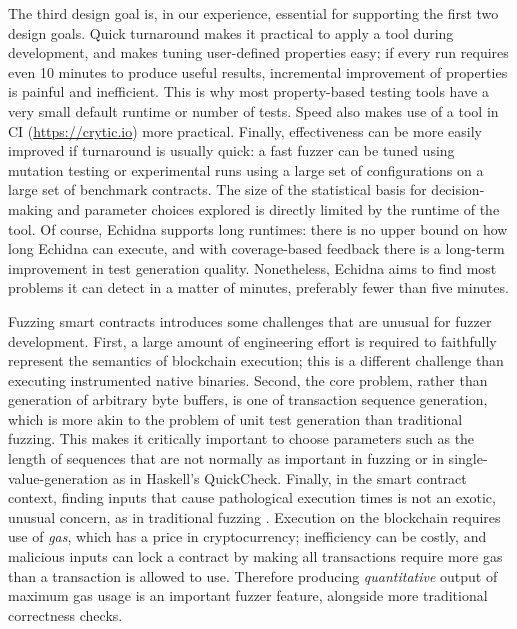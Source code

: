 The third design goal is, in our experience, essential for supporting the first two design goals.  Quick turnaround makes it practical to apply a tool during development, and makes tuning user-defined properties easy; if every run requires even 10 minutes to produce useful results, incremental improvement of properties is painful and inefficient.  This is why most property-based testing tools have a very small default runtime or number of tests.  Speed also makes use of a tool in CI (\url{https://crytic.io}) more practical. Finally, effectiveness can be more easily improved if turnaround is usually quick: a fast fuzzer can be tuned using mutation testing \cite{MutationSurvey} or experimental runs using a large set of configurations on a large set of benchmark contracts.  The size of the statistical basis for decision-making and parameter choices explored is directly limited by the runtime of the tool.  Of course, Echidna supports long runtimes:  there is no upper bound on how long Echidna can execute, and with coverage-based feedback there is a long-term improvement in test generation quality.  Nonetheless, Echidna aims to find most problems it can detect in a matter of minutes, preferably fewer than five minutes.

Fuzzing smart contracts introduces some challenges that are unusual for fuzzer development.  First, a large amount of engineering effort is required to faithfully represent the semantics of blockchain execution; this is a different challenge than executing instrumented native binaries.  Second, the core problem, rather than generation of arbitrary byte buffers, is one of transaction sequence generation, which is more akin to the problem of unit test generation \cite{Pacheco} than traditional fuzzing.  This makes it critically important to choose parameters such as the length of sequences \cite{ASE08} that are not normally as important in fuzzing or in single-value-generation as in Haskell's QuickCheck.  Finally, in the smart contract context, finding inputs that cause pathological execution times is not an exotic, unusual concern, as in traditional fuzzing \cite{lemieux2018perffuzz}.  Execution on the blockchain requires use of \emph{gas}, which has a price in cryptocurrency; inefficiency can be costly, and malicious inputs can lock a contract by making all transactions require more gas than a transaction is allowed to use.  Therefore producing \emph{quantitative} output of maximum gas usage is an important fuzzer feature, alongside more traditional correctness checks.